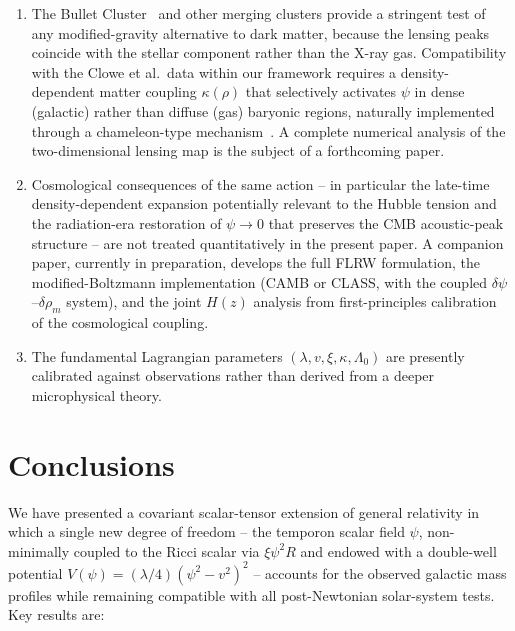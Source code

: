 \documentclass[%
    aps,
    prd,
    reprint,
    superscriptaddress,
    nofootinbib,
    floatfix,
    amsmath,amssymb,
]{revtex4-2}
\begin{document}
\begin{enumerate}
\item The Bullet Cluster~\cite{Clowe2006} and other merging clusters
provide a stringent test of any modified-gravity alternative to
dark matter, because the lensing peaks coincide with the stellar
component rather than the X-ray gas. Compatibility with the Clowe
et al.\ data within our framework requires a density-dependent
matter coupling $\kappa(\rho)$ that selectively activates $\psi$
in dense (galactic) rather than diffuse (gas) baryonic regions,
naturally implemented through a chameleon-type
mechanism~\cite{Khoury2004}. A complete numerical analysis
of the two-dimensional lensing map is the subject of a
forthcoming paper.

\item Cosmological consequences of the same action -- in particular
the late-time density-dependent expansion potentially relevant to
the Hubble tension and the radiation-era restoration of
$\psi\!\to\!0$ that preserves the CMB acoustic-peak structure --
are not treated quantitatively in the present paper. A companion
paper, currently in preparation, develops the full FLRW
formulation, the modified-Boltzmann implementation
(CAMB or CLASS, with the coupled $\delta\psi$--$\delta\rho_{m}$
system), and the joint $H(z)$ analysis from first-principles
calibration of the cosmological coupling.

\item The fundamental Lagrangian parameters $(\lambda, v, \xi, \kappa,
\Lambda_{0})$ are presently calibrated against observations rather
than derived from a deeper microphysical theory.
\end{enumerate}

\section{Conclusions}
\label{sec:conclusion}

We have presented a covariant scalar-tensor extension of general
relativity in which a single new degree of freedom -- the temporon
scalar field $\psi$, non-minimally coupled to the Ricci scalar via
$\xi\psi^{2}R$ and endowed with a double-well potential
$V(\psi)=(\lambda/4)(\psi^{2}-v^{2})^{2}$ -- accounts for the
observed galactic mass profiles while remaining compatible with
all post-Newtonian solar-system tests. Key results are:
\end{document}
